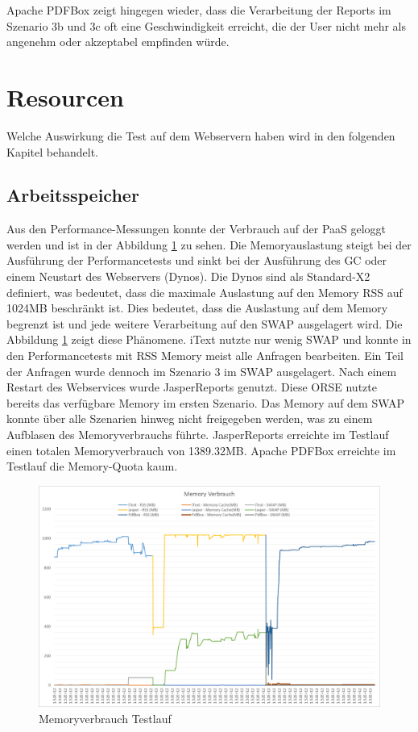 \documentclass[main.tex]{subfiles}
\begin{document}
Apache PDFBox zeigt hingegen wieder, dass die Verarbeitung der Reports im Szenario 3b und 3c oft eine Geschwindigkeit erreicht, die der User nicht mehr als angenehm oder akzeptabel empfinden würde.








\section{Resourcen}

Welche Auswirkung die Test auf dem Webservern haben wird in den folgenden Kapitel behandelt. 

\subsection{Arbeitsspeicher}
Aus den Performance-Messungen konnte der Verbrauch auf der PaaS geloggt werden und ist in der Abbildung \ref{figure:memorytestlauf} zu sehen. 
Die Memoryauslastung steigt bei der Ausführung der Performancetests und sinkt bei der Ausführung des GC oder einem Neustart des Webservers (Dynos). Die Dynos sind als Standard-X2 definiert, was bedeutet, dass die maximale Auslastung auf den Memory RSS auf 1024MB beschränkt ist. Dies bedeutet, dass die Auslastung auf dem Memory begrenzt ist und jede weitere Verarbeitung auf den SWAP ausgelagert wird. 
Die Abbildung \ref{figure:memorytestlauf} zeigt diese Phänomene. iText nutzte nur wenig SWAP und konnte in den Performancetests mit RSS Memory meist alle Anfragen bearbeiten. Ein Teil der Anfragen wurde dennoch im Szenario 3 im SWAP ausgelagert. 
Nach einem Restart des Webservices wurde JasperReports genutzt. Diese ORSE nutzte bereits das verfügbare Memory im ersten Szenario. Das Memory auf dem SWAP konnte über alle Szenarien hinweg nicht freigegeben werden, was zu einem Aufblasen des Memoryverbrauchs führte. JasperReports erreichte im Testlauf einen totalen Memoryverbrauch von 1389.32MB. Apache PDFBox erreichte im Testlauf die Memory-Quota kaum.




\begin{figure}[!ht]
\includegraphics[width=\textwidth]{mainpart/4_analyse_img/MemoryVerbrauch.png}
 \caption{Memoryverbrauch Testlauf}
 \label{figure:memorytestlauf}
\end{figure}
\end{document}
